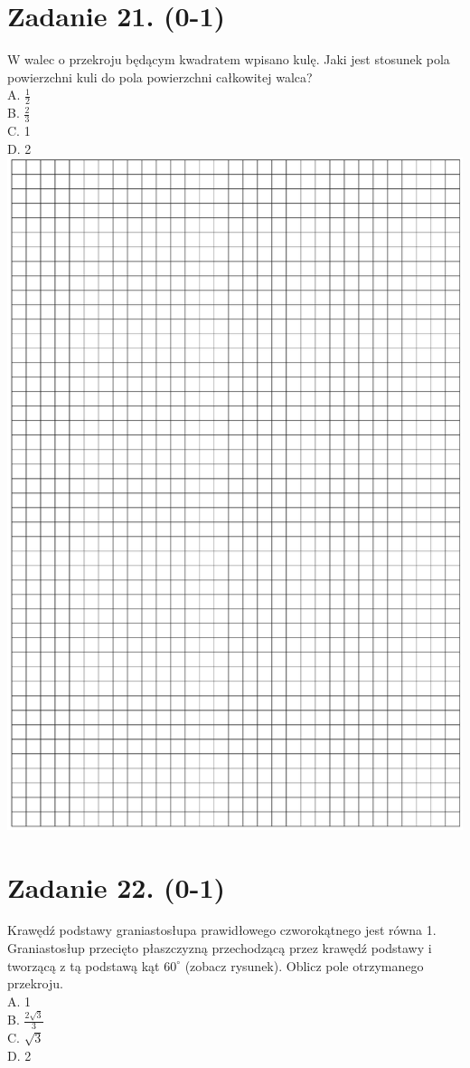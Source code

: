 \documentclass[10pt]{article}
\begin{document}
\section*{Zadanie 21. (0-1)}
W walec o przekroju będącym kwadratem wpisano kulę. Jaki jest stosunek pola powierzchni kuli do pola powierzchni całkowitej walca?\\
A. \(\frac{1}{2}\)\\
B. \(\frac{2}{3}\)\\
C. 1\\
D. 2\\
\includegraphics[max width=\textwidth, center]{2024_11_21_1e89351873aa60c4c1b9g-07}

\section*{Zadanie 22. (0-1)}
Krawędź podstawy graniastosłupa prawidłowego czworokątnego jest równa 1. Graniastosłup przecięto płaszczyzną przechodzącą przez krawędź podstawy i tworzącą z tą podstawą kąt \(60^{\circ}\) (zobacz rysunek). Oblicz pole otrzymanego przekroju.\\
A. 1\\
B. \(\frac{2 \sqrt{3}}{3}\)\\
C. \(\sqrt{3}\)\\
D. 2
\end{document}
